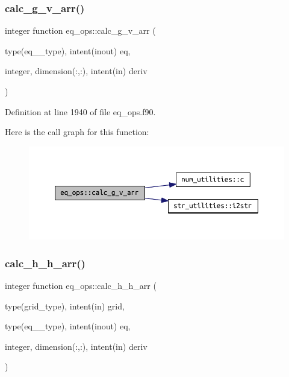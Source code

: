 \subsubsection{\texorpdfstring{calc\+\_\+g\+\_\+v\+\_\+arr()}{calc\_g\_v\_arr()}}
{\footnotesize\ttfamily integer function eq\+\_\+ops\+::calc\+\_\+g\+\_\+v\+\_\+arr (\begin{DoxyParamCaption}\item[{type(eq\+\_\+2\+\_\+type), intent(inout)}]{eq,  }\item[{integer, dimension(\+:,\+:), intent(in)}]{deriv }\end{DoxyParamCaption})}



Definition at line 1940 of file eq\+\_\+ops.\+f90.

Here is the call graph for this function\+:
\nopagebreak
\begin{figure}[H]
\begin{center}
\leavevmode
\includegraphics[width=350pt]{namespaceeq__ops_acf8e40b36693a2c3cc778a85ef66bc32_cgraph}
\end{center}
\end{figure}
\mbox{\label{namespaceeq__ops_a2874986e80f079d585725b46a327b9e8}} 
\subsubsection{\texorpdfstring{calc\+\_\+h\+\_\+h\+\_\+arr()}{calc\_h\_h\_arr()}}
{\footnotesize\ttfamily integer function eq\+\_\+ops\+::calc\+\_\+h\+\_\+h\+\_\+arr (\begin{DoxyParamCaption}\item[{type(grid\+\_\+type), intent(in)}]{grid,  }\item[{type(eq\+\_\+2\+\_\+type), intent(inout)}]{eq,  }\item[{integer, dimension(\+:,\+:), intent(in)}]{deriv }\end{DoxyParamCaption})}



